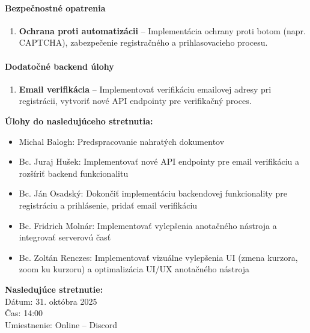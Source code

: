 \paragraph{Bezpečnostné opatrenia}
\begin{enumerate}[resume]
    \item \textbf{Ochrana proti automatizácii} – Implementácia ochrany proti botom (napr. CAPTCHA), zabezpečenie registračného a prihlasovacieho procesu.
\end{enumerate}

\paragraph{Dodatočné backend úlohy}
\begin{enumerate}[resume]
    \item \textbf{Email verifikácia} – Implementovať verifikáciu emailovej adresy pri registrácii, vytvoriť nové API endpointy pre verifikačný proces.
\end{enumerate}

\vspace{0.5cm}
\textbf{Úlohy do nasledujúceho stretnutia:}
\begin{itemize}
    \item Michal Balogh: Predspracovanie nahratých dokumentov
    \item Bc. Juraj Hušek: Implementovať nové API endpointy pre email verifikáciu a rozšíriť backend funkcionalitu
    \item Bc. Ján Osadský: Dokončiť implementáciu backendovej funkcionality pre registráciu a prihlásenie, pridať email verifikáciu
    \item Bc. Fridrich Molnár: Implementovať vylepšenia anotačného nástroja a integrovať serverovú časť
    \item Bc. Zoltán Renczes: Implementovať vizuálne vylepšenia UI (zmena kurzora, zoom ku kurzoru) a optimalizácia UI/UX anotačného nástroja
\end{itemize}

\vspace{0.5cm}
\textbf{Nasledujúce stretnutie:} \\
Dátum: 31. októbra 2025 \\
Čas: 14:00 \\
Umiestnenie: Online – Discord
